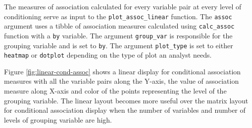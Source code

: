 The measures of association calculated for every variable pair at every
level of conditioning serve as input to the \texttt{plot\_assoc\_linear}
function. The \texttt{assoc} argument uses a tibble of association
measures calculated using \texttt{calc\_assoc} function with a
\texttt{by} variable. The argument \texttt{group\_var} is responsible
for the grouping variable and is set to \texttt{by}. The argument
\texttt{plot\_type} is set to either \texttt{heatmap} or
\texttt{dotplot} depending on the type of plot an analyst needs.

Figure \ref{fig:linear-cond-assoc} shows a linear display for
conditional association measures with all the variable pairs along the
Y-axis, the value of association measure along X-axis and color of the
points representing the level of the grouping variable. The linear
layout becomes more useful over the matrix layout for conditional
association display when the number of variables and number of levels of
grouping variable are high.

